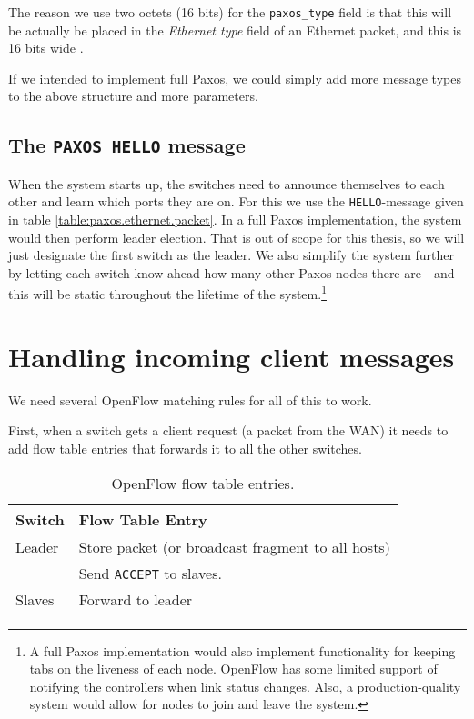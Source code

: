 The reason we use two octets (16 bits) for the \texttt{paxos\_{}type} field
is that this will be actually be placed in the \textit{Ethernet type} field
of an Ethernet packet, and this is 16 bits wide \cite{IEEE.802.3}.

If we intended to implement full Paxos, we
could simply add more message types to the above structure and more
parameters.

\subsection{The \texttt{PAXOS HELLO} message}

When the system starts up, the switches need to announce themselves to each
other and learn which ports they are on.  For this we use the
\texttt{HELLO}-message given in table \ref{table:paxos.ethernet.packet}.
In a full Paxos implementation, the system would then perform leader
election.  That is out of scope for this thesis, so we will just designate
the first switch as the leader.  We also simplify the system further by
letting each switch know ahead how many other Paxos nodes there are---and
this will be static throughout the lifetime of the system.\footnote{A full
Paxos implementation would also implement functionality for keeping tabs
on the liveness of each node.  OpenFlow has some limited support of
notifying the controllers when link status
changes.  Also, a
production-quality system would allow for nodes to join and leave the
system.}

\section{Handling incoming client messages}
\label{chapter:incoming.client}

We need several OpenFlow matching rules for all of this to work.

First, when a switch gets a client request (a packet from the
\acs{WAN}) it needs
to add flow table entries that forwards it to all the other switches.

\begin{table}[H]
  \centering
  \begin{tabular}{|l|l|}
    \hline
      \textbf{Switch} &
      \textbf{Flow Table Entry} \\

    \hline
      Leader & Store packet (or broadcast fragment to all hosts) \\
             & Send \texttt{ACCEPT} to slaves. \\

    \hline
      Slaves & Forward to leader \\

    \hline
  \end{tabular}

  \caption{OpenFlow flow table entries.}
  \label{table:paxos.flowtable.entries}
\end{table}

